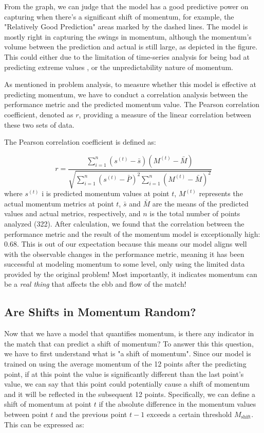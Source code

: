 \documentclass[12pt]{article}  %
\begin{document}
From the graph, we can judge that the model has a good predictive power on capturing when there's a significant shift of momentum, for example, the "Relatively Good Prediction" areas marked by the dashed lines. The model is mostly right in capturing the swings in momentum, although the momentum's volume between the prediction and actual is still large, as depicted in the figure. This could either due to the limitation of time-series analysis for being bad at predicting extreme values \cite{14}, or the unpredictability nature of momentum.

As mentioned in problem analysis, to measure whether this model is effective at predicting momentum, we have to conduct a correlation analysis between the performance metric and the predicted momentum value. The Pearson correlation coefficient, denoted as \( r \), providing a measure of the linear correlation between these two sets of data.

The Pearson correlation coefficient is defined as:

\[ r = \frac{\sum_{i=1}^{n} (s^{(t)} - \bar{s})(M^{(t)} - \bar{M})}{\sqrt{\sum_{i=1}^{n} (s^{(t)} - \bar{P})^2 \sum_{i=1}^{n} (M^{(t)} - \bar{M})^2}} \]
where \( s^{(t)} \) i is predicted momentum values at point \( t \), \( M^{(t)} \) represents the actual momentum metrics at point \( t \), \( \bar{s} \) and \( \bar{M} \) are the means of the predicted values and actual metrics, respectively, and \( n \) is the total number of points analyzed (322). After calculation, we found that the correlation between the performance metric and the result of the momentum model is exceptionally high: $\mathbf{0.68}$. This is out of our expectation because this means our model aligns well with the observable changes in the performance metric, meaning it has been successful at modeling momentum to some level, only using the limited data provided by the original problem! Most importantly, it indicates momentum can be a \textit{real thing} that affects the ebb and flow of the match!

\subsection{Are Shifts in Momentum Random?}
Now that we have a model that quantifies momentum, is there any indicator in the match that can predict a shift of momentum? To answer this this question, we have to first understand what is "a shift of momentum". Since our model is trained on using the average momentum of the 12 points after the predicting point, if at this point the value is significantly different than the last point's value, we can say that this point could potentially cause a shift of momentum and it will be reflected in the subsequent 12 points. Specifically, we can define a shift of momentum at point \( t \) if the absolute difference in the momentum values between point \( t \) and the previous point \( t-1 \) exceeds a certain threshold \( M_{\text{shift}} \). This can be expressed as:
\end{document}
